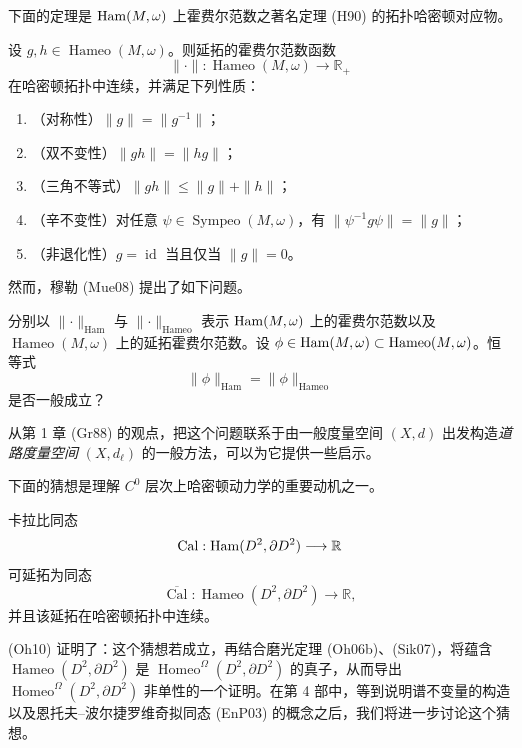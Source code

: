 下面的定理是 $\operatorname{Ham}(M,\omega)$ 上霍费尔范数之著名定理 (H90) 的拓扑哈密顿对应物。

\begin{theorem}\label{thm:extended-hofer-norm-hameomorphisms}
设 $g,h\in\operatorname{Hameo}(M,\omega)$。则延拓的霍费尔范数函数
\[
 \|\mathord\cdot\|:\operatorname{Hameo}(M,\omega)
 \longrightarrow\mathbb R_+
\]
在哈密顿拓扑中连续，并满足下列性质：
\begin{enumerate}[label=(\arabic*)]
 \item （对称性）$\|g\|=\|g^{-1}\|$；
 \item （双不变性）$\|gh\|=\|hg\|$；
 \item （三角不等式）$\|gh\|\leq\|g\|+\|h\|$；
 \item （辛不变性）对任意
 $\psi\in\operatorname{Sympeo}(M,\omega)$，有
 $\|\psi^{-1}g\psi\|=\|g\|$；
 \item （非退化性）$g=\operatorname{id}$ 当且仅当 $\|g\|=0$。
\end{enumerate}
\end{theorem}

然而，穆勒 (Mue08) 提出了如下问题。

\begin{question}[穆勒]\label{ques:hofer-norm-restriction-hameo}
分别以 $\|\mathord\cdot\|_{\mathrm{Ham}}$ 与
$\|\mathord\cdot\|_{\mathrm{Hameo}}$ 表示
$\operatorname{Ham}(M,\omega)$ 上的霍费尔范数以及
$\operatorname{Hameo}(M,\omega)$ 上的延拓霍费尔范数。设
$\phi\in\operatorname{Ham}(M,\omega)\subset\operatorname{Hameo}(M,\omega)$。恒等式
\[
 \|\phi\|_{\mathrm{Ham}}=\|\phi\|_{\mathrm{Hameo}}
\]
是否一般成立？
\end{question}

从第 1 章 (Gr88) 的观点，把这个问题联系于由一般度量空间
$(X,d)$ 出发构造\emph{道路度量空间} $(X,d_\ell)$ 的一般方法，可以为它提供一些启示。

下面的猜想是理解 $C^0$ 层次上哈密顿动力学的重要动机之一。

\begin{conjecture}\label{conj:calabi-homomorphism-hameomorphisms}
卡拉比同态
\[
 \operatorname{Cal}:\operatorname{Ham}(D^2,\partial D^2)\longrightarrow\mathbb R
\]
可延拓为同态
\[
 \overline{\operatorname{Cal}}:
 \operatorname{Hameo}(D^2,\partial D^2)\longrightarrow\mathbb R,
\]
并且该延拓在哈密顿拓扑中连续。
\end{conjecture}

(Oh10) 证明了：这个猜想若成立，再结合磨光定理 (Oh06b)、(Sik07)，将蕴含
$\operatorname{Hameo}(D^2,\partial D^2)$ 是
$\operatorname{Homeo}^\Omega(D^2,\partial D^2)$ 的真子，从而导出
$\operatorname{Homeo}^\Omega(D^2,\partial D^2)$ 非单性的一个证明。在第 4 部中，等到说明谱不变量的构造以及恩托夫--波尔捷罗维奇拟同态 (EnP03) 的概念之后，我们将进一步讨论这个猜想。
